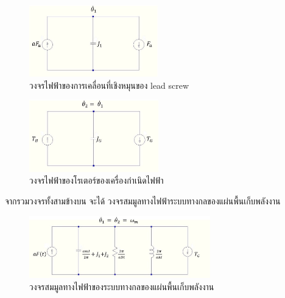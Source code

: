 \documentclass[11pt,a4paper]{article}
\begin{document}
\begin{figure}[!htb]
    \begin{center}
        \includegraphics[width=0.5\textwidth]{cir2lx.jpg}
    \end{center}
    \caption{วงจรไฟฟ้าของการเคลื่อนที่เชิงหมุนของ lead screw }
    \label{cir2_lx}
\end{figure}
\begin{figure}[!htb]
    \begin{center}
        \includegraphics[width=0.5\textwidth]{cir3lx.jpg}
    \end{center}
    \caption{วงจรไฟฟ้าของโรเตอร์ของเครื่องกำเนิดไฟฟ้า}
    \label{cir3lx}
\end{figure}
จากรวมวงจรทั้งสามข้างบน จะได้ วงจรสมมูลทางไฟฟ้าระบบทางกลของแผ่นพื้นเก็บพลังงาน
\begin{figure}[!htb]
    \begin{center}
        \includegraphics[width=0.7\textwidth]{cir4lx.jpg}
    \end{center}
    \caption{วงจรสมมูลทางไฟฟ้าของระบบทางกลของแผ่นพื้นเก็บพลังงาน}
    \label{cir4lx}
\end{figure}



\newpage
\end{document}
